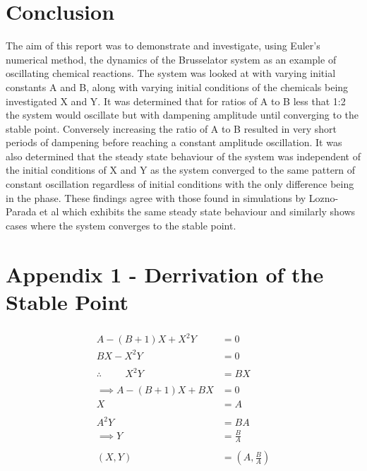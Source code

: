\documentclass[reprint, amsmath, amssymb, aps]{revtex4-2}
\begin{document}
\section{Conclusion}
The aim of this report was to demonstrate and investigate, using Euler's numerical method, the dynamics of the Brusselator system as an example of oscillating chemical reactions. The system was looked at with varying initial constants A and B, along with varying initial conditions of the chemicals being investigated X and Y. It was determined that for ratios of A to B less that 1:2 the system would oscillate but with dampening amplitude until converging to the stable point. Conversely increasing the ratio of A to B resulted in very short periods of dampening before reaching a constant amplitude oscillation. It was also determined that the steady state behaviour of the system was independent of the initial conditions of X and Y as the system converged to the same pattern of constant oscillation regardless of initial conditions with the only difference being in the phase. These findings agree with those found in simulations by Lozno-Parada et al\cite{parada} which exhibits the same steady state behaviour and similarly shows cases where the system converges to the stable point.

\clearpage


\clearpage

\section*{Appendix 1 - Derrivation of the Stable Point}
\begin{align*}
	\begin{aligned}
	A - (B + 1)X + X^2 Y &= 0\\
	BX - X^2 Y &= 0\\
	\\
	\therefore \hspace{1cm} X^2 Y &= BX\\
	\\
	\implies A - (B + 1)X + BX &= 0\\
	X &= A\\
	\\
	A^2 Y &= BA\\
	\implies Y &= \frac{B}{A}\\
	\\
	(X, Y) &= \left(A, \frac{B}{A}\right)
	\end{aligned}
\end{align*}
\end{document}
